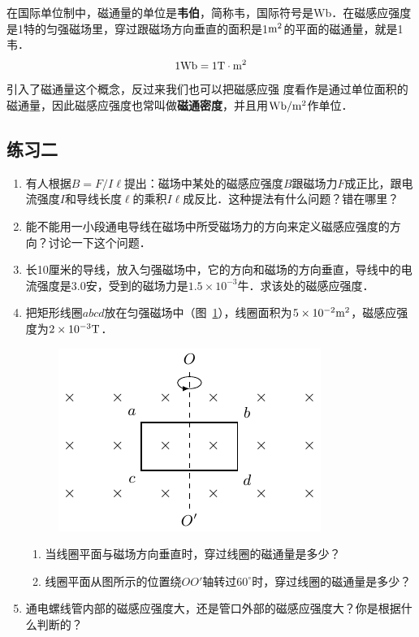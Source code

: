 在国际单位制中，磁通量的单位是\textbf{韦伯}，简称韦，国际符号是Wb．在磁感应强度是1特的匀强磁场里，穿过跟磁场方向垂直的面积是1${\rm m^2}$的平面的磁通量，就是1韦．
\[1{\rm Wb}=1{\rm T\cdot m^2}\]
引入了磁通量这个概念，反过来我们也可以把磁感应强
度看作是通过单位面积的磁通量，因此磁感应强度也常叫做\textbf{磁通密度}，并且用${\rm Wb}/{\rm m^2}$作单位．

\subsection*{练习二}
\begin{enumerate}
    \item 有人根据$B=F/I\ell$提出：磁场中某处的磁感应强度$B$跟磁场力$F$成正比，跟电流强度$I$和导线长度$\ell$的乘积$I\ell$成反比．这种提法有什么问题？错在哪里？
    \item 能不能用一小段通电导线在磁场中所受磁场力的方向来定义磁感应强度的方向？讨论一下这个问题．
    \item 长10厘米的导线，放入匀强磁场中，它的方向和磁场的方向垂直，导线中的电流强度是3.0安，受到的磁场力是$1.5\times10^{-3}$牛．求该处的磁感应强度．
    \item 把矩形线圈$abcd$放在匀强磁场中（图~\ref{fig_C_1-19}），线圈面积为$5\times10^{-2}{\rm m^2}$，磁感应强度为$2\times10^{-3}{\rm T}$．
    \begin{figure}[htbp]
        \centering
        \includegraphics{fig/C/1-19.pdf}
        \caption{}\label{fig_C_1-19}
    \end{figure}
     \begin{enumerate}
        \item 当线圈平面与磁场方向垂直时，穿过线圈的磁通量是多少？
        \item 线圈平面从图所示的位置绕$OO'$轴转过$60^\circ$时，穿过线圈的磁通量是多少？
    \end{enumerate}
    \item 通电螺线管内部的磁感应强度大，还是管口外部的磁感应强度大？你是根据什么判断的？
\end{enumerate}



